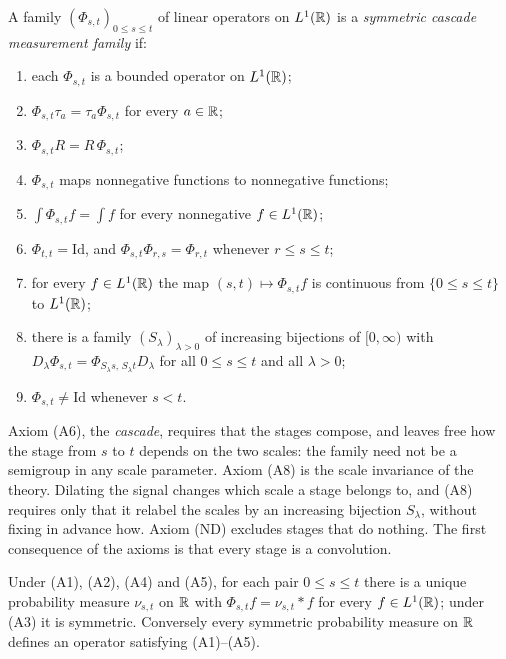 \begin{definition}\label{def:line-family}
A family $(\Phi_{s,t})_{0 \le s \le t}$ of linear operators on $L^1(\mathbb{R})$ is a \emph{symmetric
cascade measurement family} if:
\begin{enumerate}
\item[(A1)] each $\Phi_{s,t}$ is a bounded operator on $L^1(\mathbb{R})$;
\item[(A2)] $\Phi_{s,t}\tau_a = \tau_a\Phi_{s,t}$ for every $a \in \mathbb{R}$;
\item[(A3)] $\Phi_{s,t}R = R\,\Phi_{s,t}$;
\item[(A4)] $\Phi_{s,t}$ maps nonnegative functions to nonnegative functions;
\item[(A5)] $\int\Phi_{s,t}f = \int f$ for every nonnegative $f \in L^1(\mathbb{R})$;
\item[(A6)] $\Phi_{t,t} = \mathrm{Id}$, and $\Phi_{s,t}\Phi_{r,s} = \Phi_{r,t}$ whenever
$r \le s \le t$;
\item[(A7)] for every $f \in L^1(\mathbb{R})$ the map $(s,t) \mapsto \Phi_{s,t}f$ is continuous from
$\{0 \le s \le t\}$ to $L^1(\mathbb{R})$;
\item[(A8)] there is a family $(S_\lambda)_{\lambda > 0}$ of increasing bijections of
$[0,\infty)$ with $D_\lambda\Phi_{s,t} = \Phi_{S_\lambda s,\,S_\lambda t}D_\lambda$ for all
$0 \le s \le t$ and all $\lambda > 0$;
\item[(ND)] $\Phi_{s,t} \ne \mathrm{Id}$ whenever $s < t$.
\end{enumerate}
\end{definition}

Axiom (A6), the \emph{cascade}, requires
that the stages compose, and leaves free how the stage from $s$ to $t$ depends on the two scales:
the family need not be a semigroup in any scale parameter. Axiom (A8) is the scale invariance of
the theory. Dilating the signal changes which scale a stage belongs to, and (A8) requires only that it
relabel the scales by an increasing bijection $S_\lambda$, without fixing in advance how. Axiom (ND)
excludes stages that do nothing. The first consequence of the axioms is that every stage is a
convolution.

\begin{lemma}\label{lem:line-representation}
Under (A1), (A2), (A4) and (A5), for each pair $0 \le s \le t$ there is a unique probability
measure $\nu_{s,t}$ on $\mathbb{R}$ with $\Phi_{s,t}f = \nu_{s,t} * f$ for every $f \in L^1(\mathbb{R})$; under
(A3) it is symmetric. Conversely every symmetric probability measure on $\mathbb{R}$ defines an operator
satisfying (A1)--(A5).
\end{lemma}

